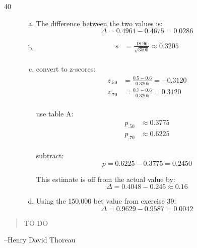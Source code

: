 \documentclass[letterpaper, landscape]{exam}
\begin{document}
\begin{description}
      \newpage

      \item[40]
        \begin{enumerate}[(a)]
          \item The difference between the two values is:
            \[
              \Delta = 0.4961 - 0.4675 = \boxed{ 0.0286 }
            \]

          \item
            \begin{align*}
              s &= \frac{18.96}{\sqrt{3500}} \approx \boxed{ 0.3205 } \\
            \end{align*}
            
          \item
            convert to z-scores:
            \begin{align*}
              z_{.50} &= \frac{0.5 - 0.6}{0.3205} = -0.3120 \\
              z_{.70} &= \frac{0.7 - 0.6}{0.3205} = 0.3120 \\
            \end{align*}

            use table A:
            \begin{align*}
              p_{.50} & \approx 0.3775 \\
              p_{.70} & \approx 0.6225 \\
            \end{align*}

            subtract:
            \[
              p = 0.6225 - 0.3775 = 0.2450
            \]

            This estimate is off from the actual value by:
            \[
              \Delta = 0.4048 - 0.245 \approx \boxed{ 0.16 }
            \]
            
          \item Using the 150,000 bet value from exercise 39:
            \[
              \Delta = 0.9629 - 0.9587 = \boxed{ 0.0042 }
            \]

        \end{enumerate}
  \end{description}

  \else
    \vspace{10 cm}
    \begin{quote}
      \begin{em}
        TO DO
      \end{em}
    \end{quote}
    \hspace{1 cm} --Henry David Thoreau
  \fi
\end{document}
